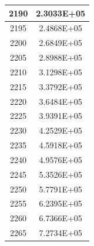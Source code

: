 \documentclass[a4paper]{article}
\begin{document}
\begin{tabular}{|c|c|}
		\hline
		2190 & 2.3033E+05 \\
		\hline
		2195 & 2.4868E+05 \\
		\hline
		2200 & 2.6849E+05 \\
		\hline
		2205 & 2.8988E+05 \\
		\hline
		2210 & 3.1298E+05 \\
		\hline
		2215 & 3.3792E+05 \\
		\hline
		2220 & 3.6484E+05 \\
		\hline
		2225 & 3.9391E+05 \\
		\hline
		2230 & 4.2529E+05 \\
		\hline
		2235 & 4.5918E+05 \\
		\hline
		2240 & 4.9576E+05 \\
		\hline
		2245 & 5.3526E+05 \\
		\hline
		2250 & 5.7791E+05 \\
		\hline
		2255 & 6.2395E+05 \\
		\hline
		2260 & 6.7366E+05 \\
		\hline
		2265 & 7.2734E+05 \\
		\hline
	\end{tabular}
	\hfill
\end{document}
